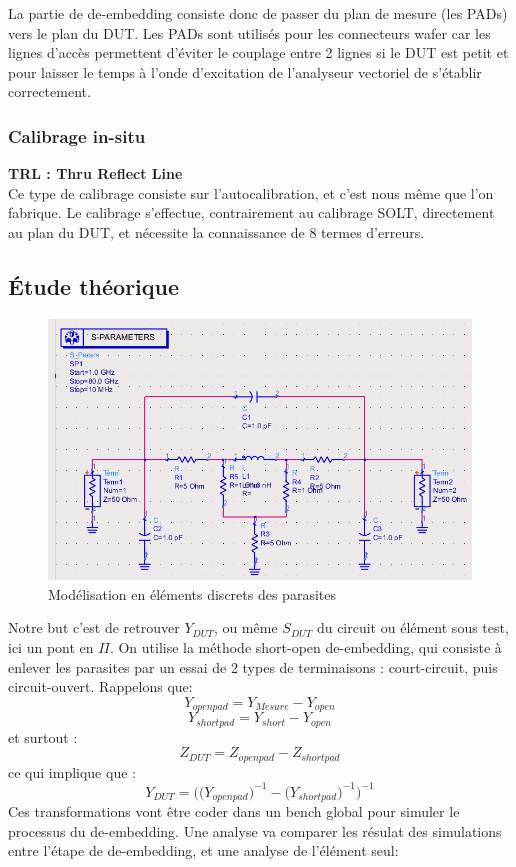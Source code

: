 \documentclass[a4paper]{article}
\begin{document}
La partie de de-embedding consiste donc de passer du plan de mesure (les PADs) vers le plan du DUT.
Les PADs sont utilis\'es pour les connecteurs wafer car les lignes d'acc\`es permettent d'\'eviter le couplage
entre 2 lignes si le DUT est petit et pour laisser le temps \`a l'onde d'excitation de l'analyseur vectoriel
de s'\'etablir correctement.

\subsubsection{Calibrage in-situ}
\textbf{TRL : Thru Reflect Line } \\
Ce type de calibrage consiste sur l'autocalibration, et c'est nous m\^eme que l'on fabrique.
Le calibrage s'effectue, contrairement au calibrage SOLT, directement au plan du DUT, et n\'ecessite la connaissance
de 8 termes d'erreurs.

\subsection{\'Etude th\'eorique}

\begin{figure}[!htb]
\begin{center}
  \includegraphics[scale=0.45]{de-embedding_scheme.png}
  \caption{Mod\'elisation en \'el\'ements discrets des parasites}
  \label{de-embedding-scheme}
\end{center}
\end{figure}

Notre but c'est de retrouver $Y_{DUT}$, ou m\^eme $S_{DUT}$ du circuit ou \'el\'ement sous test, ici un pont en $\Pi$.
On utilise la m\'ethode short-open de-embedding, qui consiste \`a enlever les parasites par un essai de 2 types de terminaisons :
court-circuit, puis circuit-ouvert. Rappelons que\cite{sim-elec-cours}:
\[
Y_{openpad} = Y_{Mesure} - Y_{open}
\]
 \clearpage
 \[
Y_{shortpad} = Y_{short} - Y_{open}
\]
et surtout :
\[
Z_{DUT} = Z_{openpad} - Z_{shortpad}
\]
ce qui implique que :
\[
Y_{DUT} = \bigg( \big( Y_{openpad} \big)^{-1} - \big( Y_{shortpad} \big)^{-1} \bigg)^{-1}
\]
Ces transformations vont \^etre coder dans un bench global pour simuler le processus du de-embedding. Une analyse va comparer
les r\'esulat des simulations entre l'\'etape de de-embedding, et une analyse de l'\'el\'ement seul:
\end{document}
